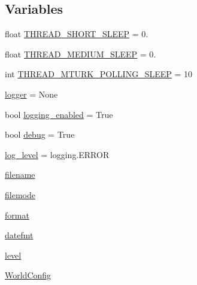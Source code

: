 \subsection*{Variables}
\begin{DoxyCompactItemize}
\item 
float \hyperlink{namespaceparlai_1_1chat__service_1_1services_1_1messenger_1_1shared__utils_afb425c61109485e1d52e92b60c9450c0}{T\+H\+R\+E\+A\+D\+\_\+\+S\+H\+O\+R\+T\+\_\+\+S\+L\+E\+EP} = 0.
\item 
float \hyperlink{namespaceparlai_1_1chat__service_1_1services_1_1messenger_1_1shared__utils_a3ac242168092ef038599d7c09da5abc1}{T\+H\+R\+E\+A\+D\+\_\+\+M\+E\+D\+I\+U\+M\+\_\+\+S\+L\+E\+EP} = 0.
\item 
int \hyperlink{namespaceparlai_1_1chat__service_1_1services_1_1messenger_1_1shared__utils_ae809cc2da9c0a401060027084194d913}{T\+H\+R\+E\+A\+D\+\_\+\+M\+T\+U\+R\+K\+\_\+\+P\+O\+L\+L\+I\+N\+G\+\_\+\+S\+L\+E\+EP} = 10
\item 
\hyperlink{namespaceparlai_1_1chat__service_1_1services_1_1messenger_1_1shared__utils_a619c782b4554bd799a6d2c8d3f46d45d}{logger} = None
\item 
bool \hyperlink{namespaceparlai_1_1chat__service_1_1services_1_1messenger_1_1shared__utils_a54c97f1a36a6eb1f4e0f9fe6fe88f31d}{logging\+\_\+enabled} = True
\item 
bool \hyperlink{namespaceparlai_1_1chat__service_1_1services_1_1messenger_1_1shared__utils_af6859bf0555562e35f8ca5f3afc136f0}{debug} = True
\item 
\hyperlink{namespaceparlai_1_1chat__service_1_1services_1_1messenger_1_1shared__utils_accb5c9988dca62a46e243f84574b9ccc}{log\+\_\+level} = logging.\+E\+R\+R\+OR
\item 
\hyperlink{namespaceparlai_1_1chat__service_1_1services_1_1messenger_1_1shared__utils_a13a4b70d7eeaebd92b382f1f79d6183d}{filename}
\item 
\hyperlink{namespaceparlai_1_1chat__service_1_1services_1_1messenger_1_1shared__utils_a86b5a9127568ffe3778ee2627ad5f1fe}{filemode}
\item 
\hyperlink{namespaceparlai_1_1chat__service_1_1services_1_1messenger_1_1shared__utils_a32e2e2022b824fbaf80c747160b52a76}{format}
\item 
\hyperlink{namespaceparlai_1_1chat__service_1_1services_1_1messenger_1_1shared__utils_ac2178d68efd5a7cca079a851ff5ee252}{datefmt}
\item 
\hyperlink{namespaceparlai_1_1chat__service_1_1services_1_1messenger_1_1shared__utils_a35382c2e2179499d2a3debea2689be93}{level}
\item 
\hyperlink{namespaceparlai_1_1chat__service_1_1services_1_1messenger_1_1shared__utils_a2fad0a70ab62b27b2692978de3a852f1}{World\+Config}
\end{DoxyCompactItemize}


